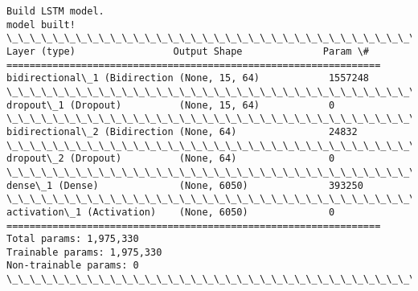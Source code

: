 \documentclass[11pt]{article}
\begin{document}
    \begin{Verbatim}[commandchars=\\\{\}]
Build LSTM model.
model built!
\_\_\_\_\_\_\_\_\_\_\_\_\_\_\_\_\_\_\_\_\_\_\_\_\_\_\_\_\_\_\_\_\_\_\_\_\_\_\_\_\_\_\_\_\_\_\_\_\_\_\_\_\_\_\_\_\_\_\_\_\_\_\_\_\_
Layer (type)                 Output Shape              Param \#   
=================================================================
bidirectional\_1 (Bidirection (None, 15, 64)            1557248   
\_\_\_\_\_\_\_\_\_\_\_\_\_\_\_\_\_\_\_\_\_\_\_\_\_\_\_\_\_\_\_\_\_\_\_\_\_\_\_\_\_\_\_\_\_\_\_\_\_\_\_\_\_\_\_\_\_\_\_\_\_\_\_\_\_
dropout\_1 (Dropout)          (None, 15, 64)            0         
\_\_\_\_\_\_\_\_\_\_\_\_\_\_\_\_\_\_\_\_\_\_\_\_\_\_\_\_\_\_\_\_\_\_\_\_\_\_\_\_\_\_\_\_\_\_\_\_\_\_\_\_\_\_\_\_\_\_\_\_\_\_\_\_\_
bidirectional\_2 (Bidirection (None, 64)                24832     
\_\_\_\_\_\_\_\_\_\_\_\_\_\_\_\_\_\_\_\_\_\_\_\_\_\_\_\_\_\_\_\_\_\_\_\_\_\_\_\_\_\_\_\_\_\_\_\_\_\_\_\_\_\_\_\_\_\_\_\_\_\_\_\_\_
dropout\_2 (Dropout)          (None, 64)                0         
\_\_\_\_\_\_\_\_\_\_\_\_\_\_\_\_\_\_\_\_\_\_\_\_\_\_\_\_\_\_\_\_\_\_\_\_\_\_\_\_\_\_\_\_\_\_\_\_\_\_\_\_\_\_\_\_\_\_\_\_\_\_\_\_\_
dense\_1 (Dense)              (None, 6050)              393250    
\_\_\_\_\_\_\_\_\_\_\_\_\_\_\_\_\_\_\_\_\_\_\_\_\_\_\_\_\_\_\_\_\_\_\_\_\_\_\_\_\_\_\_\_\_\_\_\_\_\_\_\_\_\_\_\_\_\_\_\_\_\_\_\_\_
activation\_1 (Activation)    (None, 6050)              0         
=================================================================
Total params: 1,975,330
Trainable params: 1,975,330
Non-trainable params: 0
\_\_\_\_\_\_\_\_\_\_\_\_\_\_\_\_\_\_\_\_\_\_\_\_\_\_\_\_\_\_\_\_\_\_\_\_\_\_\_\_\_\_\_\_\_\_\_\_\_\_\_\_\_\_\_\_\_\_\_\_\_\_\_\_\_

    \end{Verbatim}
\end{document}
